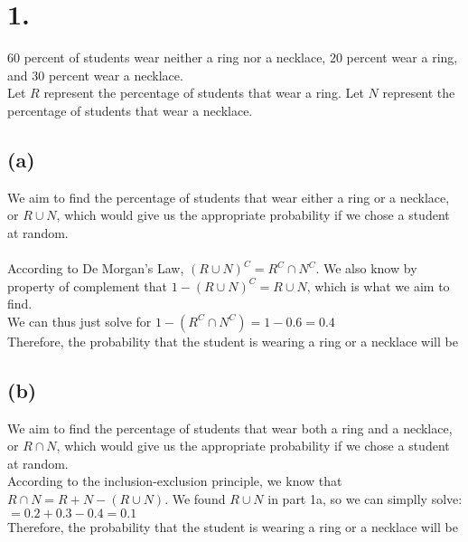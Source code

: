 \documentclass{article}
\begin{document}
\thispagestyle{firstpageheader}

\section*{1.}
{\Large 
60 percent of students wear neither a ring nor a necklace, 20 percent wear a ring, and 30 percent wear a necklace. \\ 
Let $R$ represent the percentage of students that wear a ring. Let $N$ represent the percentage of students that wear a necklace.

\subsection*{(a)}
 We aim to find the percentage of students that wear either a ring or a necklace, or $R \cup N$, which would give us the appropriate probability if we chose a student at random. \\ \\
According to De Morgan's Law, $(R \cup N)^C = R^C \cap N^C$. We also know by property of complement that $1 - (R \cup N)^C = R \cup N$, which is what we aim to find. \\
We can thus just solve for $1 - (R^C \cap N^C) = 1 - 0.6 = 0.4$ \\
Therefore, the probability that the student is wearing a ring or a necklace will be 

\subsection*{(b)}
We aim to find the percentage of students that wear both a ring and a necklace, or $R \cap N$, which would give us the appropriate probability if we chose a student at random. \\
According to the inclusion-exclusion principle, we know that $R \cap N = R + N - (R \cup N)$. We found $R \cup N$ in part 1a, so we can simplly solve: \\
$= 0.2 + 0.3 - 0.4 = 0.1$ \\
Therefore, the probability that the student is wearing a ring or a necklace will be 

}
\end{document}
